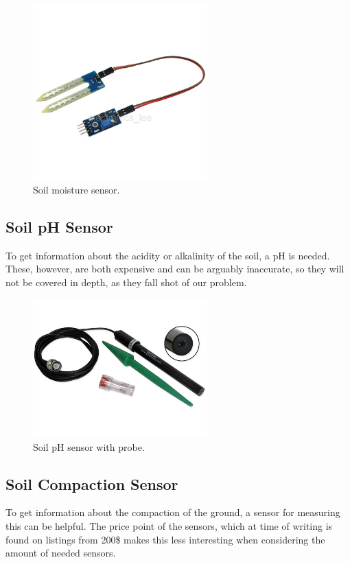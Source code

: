 \begin{figure}[H]\label{moisture_figure}
\centering
\includegraphics[width=0.6\textwidth]{chapters/analysis/figs/soilMoistureSensor.jpg}
\caption{Soil moisture sensor.}
\label{fig:moistureSensor}
\end{figure}



\subsection{Soil pH Sensor}
To get information about the acidity or alkalinity of the soil, a pH is needed. These, however, are both expensive and can be arguably inaccurate, so they will not be covered in depth, as they fall shot of our problem. 

\begin{figure}[H]
\centering
\includegraphics[width=0.6\textwidth]{chapters/analysis/figs/soilPhProbe.jpg}
\caption{Soil pH sensor with probe.}
\label{fig:phSensor}
\end{figure}

\subsection{Soil Compaction Sensor}
To get information about the compaction of the ground, a sensor for measuring this can be helpful. %
The price point of the sensors, which at time of writing is found on listings from 200\$ makes this less interesting when considering the amount of needed sensors. %

